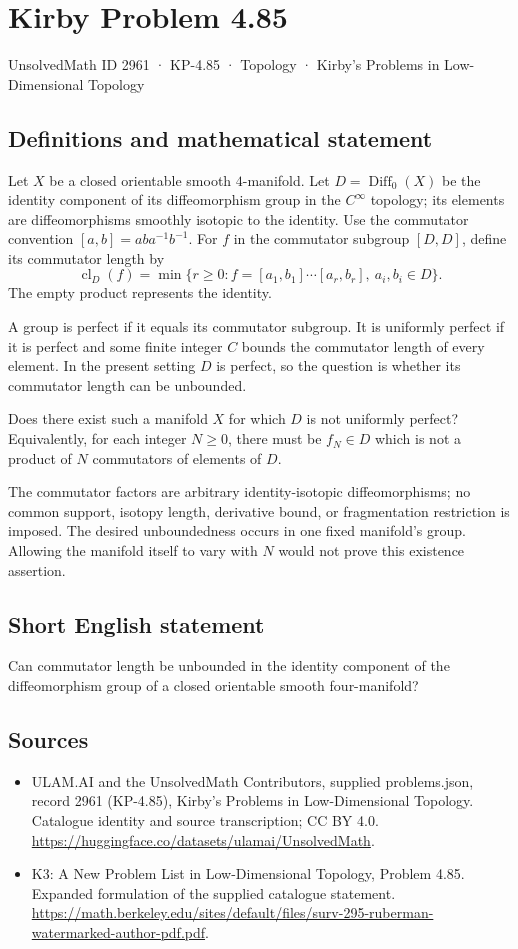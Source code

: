 \documentclass[11pt,a4paper]{article}
\begin{document}
\section*{Kirby Problem 4.85}\label{2961}
{\small UnsolvedMath ID 2961 · KP-4.85 · Topology · Kirby's Problems in Low-Dimensional Topology}
\subsection{Definitions and mathematical statement}
Let $X$ be a closed orientable smooth $4$-manifold. Let
$D=\operatorname{Diff}_0(X)$ be the identity component of its
diffeomorphism group in the $C^\infty$ topology; its elements are
diffeomorphisms smoothly isotopic to the identity.
Use the commutator convention $[a,b]=aba^{-1}b^{-1}$.
For $f$ in the commutator subgroup $[D,D]$, define its commutator
length by
\[
 \operatorname{cl}_D(f)=\min\{r\ge0:
           f=[a_1,b_1]\cdots[a_r,b_r],\ a_i,b_i\in D\}.
\]
The empty product represents the identity.

A group is perfect if it equals its commutator subgroup. It is
uniformly perfect if it is perfect and some finite integer $C$
bounds the commutator length of every element. In the present
setting $D$ is perfect, so the question is whether its commutator
length can be unbounded.

Does there exist such a manifold $X$ for which $D$ is not
uniformly perfect? Equivalently, for each integer $N\ge0$, there
must be $f_N\in D$ which is not a product of $N$ commutators
of elements of $D$.

The commutator factors are arbitrary identity-isotopic diffeomorphisms;
no common support, isotopy length, derivative bound, or fragmentation
restriction is imposed. The desired unboundedness occurs in one
fixed manifold's group. Allowing the manifold itself to vary with
$N$ would not prove this existence assertion.
\subsection{Short English statement}
Can commutator length be unbounded in the identity component of the diffeomorphism group of a closed orientable smooth four-manifold?
\subsection{Sources}
\begin{itemize}
\item[S1] ULAM.AI and the UnsolvedMath Contributors, supplied problems.json, record 2961 (KP-4.85), Kirby's Problems in Low-Dimensional Topology. Catalogue identity and source transcription; CC BY 4.0.
\url{https://huggingface.co/datasets/ulamai/UnsolvedMath}.
\item[S2] K3: A New Problem List in Low-Dimensional Topology, Problem 4.85. Expanded formulation of the supplied catalogue statement.
\url{https://math.berkeley.edu/sites/default/files/surv-295-ruberman-watermarked-author-pdf.pdf}.
\end{itemize}
\end{document}

